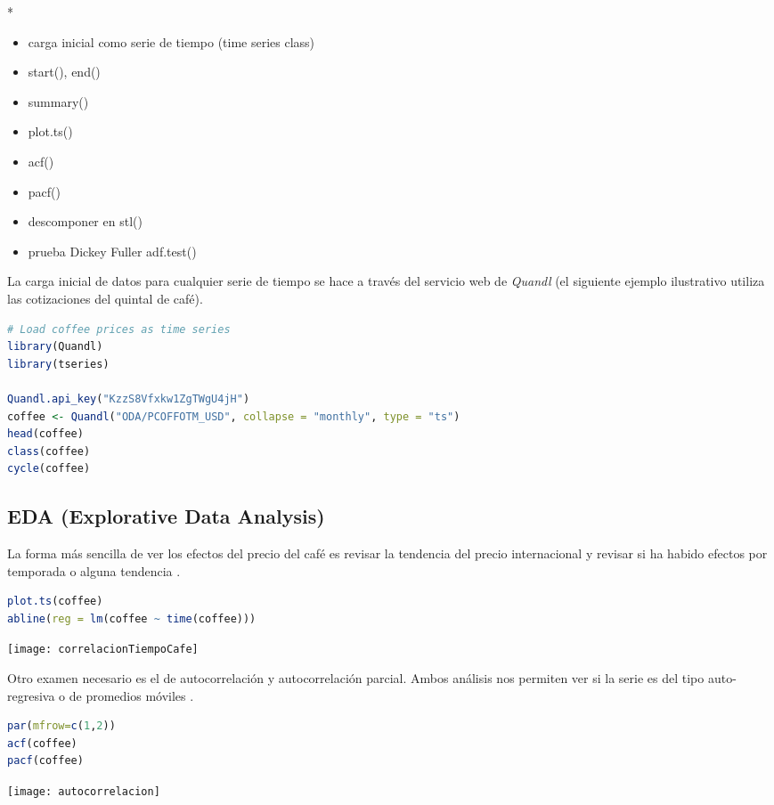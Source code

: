 \begin{spacing}{1.5}
* \begin{itemize}
	\item carga inicial como serie de tiempo (time series class)
	\item start(), end()
    \item summary()
    \item plot.ts()
    \item acf()
    \item pacf()
    \item descomponer en stl()
    \item prueba Dickey Fuller adf.test()
\end{itemize}

La carga inicial de datos para cualquier serie de tiempo se hace a través del servicio web de \textit{Quandl} (el siguiente ejemplo ilustrativo utiliza las cotizaciones del quintal de café).

\begin{lstlisting}[language=R]
# Load coffee prices as time series
library(Quandl)
library(tseries)

Quandl.api_key("KzzS8Vfxkw1ZgTWgU4jH")
coffee <- Quandl("ODA/PCOFFOTM_USD", collapse = "monthly", type = "ts")
head(coffee)
class(coffee)
cycle(coffee)
\end{lstlisting}

\subsection{EDA (Explorative Data Analysis)}
La forma más sencilla de ver los efectos del precio del café es revisar la tendencia del precio internacional y revisar si ha habido efectos por temporada o alguna tendencia \cite{daroczi}.

\begin{lstlisting}[language=R]
plot.ts(coffee)
abline(reg = lm(coffee ~ time(coffee)))
\end{lstlisting}

\texttt{[image: correlacionTiempoCafe]}

Otro examen necesario es el de autocorrelación y autocorrelación parcial. Ambos análisis nos permiten ver si la serie es del tipo auto-regresiva o de promedios móviles \cite{hyndman}.

\begin{lstlisting}[language=R]
par(mfrow=c(1,2))
acf(coffee)
pacf(coffee)
\end{lstlisting}

\texttt{[image: autocorrelacion]}\\


\end{spacing}
